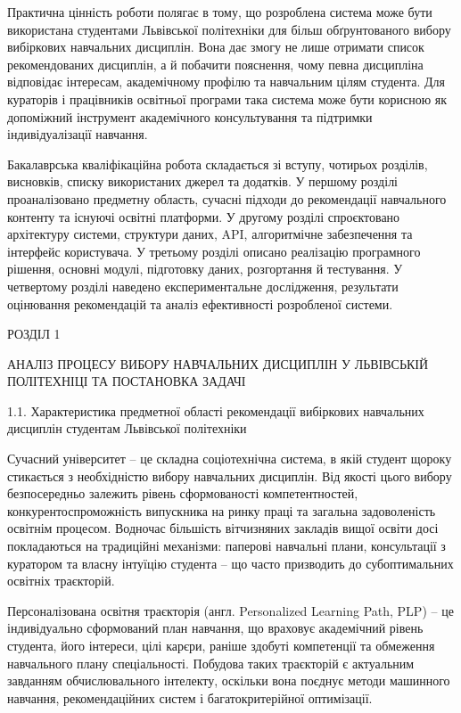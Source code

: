 \documentclass[
]{article}
\begin{document}
Практична цінність роботи полягає в тому, що розроблена система може
бути використана студентами Львівської політехніки для більш
обґрунтованого вибору вибіркових навчальних дисциплін. Вона дає змогу не
лише отримати список рекомендованих дисциплін, а й побачити пояснення,
чому певна дисципліна відповідає інтересам, академічному профілю та
навчальним цілям студента. Для кураторів і працівників освітньої
програми така система може бути корисною як допоміжний інструмент
академічного консультування та підтримки індивідуалізації навчання.

Бакалаврська кваліфікаційна робота складається зі вступу, чотирьох
розділів, висновків, списку використаних джерел та додатків. У першому
розділі проаналізовано предметну область, сучасні підходи до
рекомендації навчального контенту та існуючі освітні платформи. У
другому розділі спроєктовано архітектуру системи, структури даних, API,
алгоритмічне забезпечення та інтерфейс користувача. У третьому розділі
описано реалізацію програмного рішення, основні модулі, підготовку
даних, розгортання й тестування. У четвертому розділі наведено
експериментальне дослідження, результати оцінювання рекомендацій та
аналіз ефективності розробленої системи.

\protect{}\label{_Toc230434077}{}РОЗДІЛ 1

\protect{}\label{_Toc230434078}{}АНАЛІЗ ПРОЦЕСУ ВИБОРУ
НАВЧАЛЬНИХ ДИСЦИПЛІН У ЛЬВІВСЬКІЙ ПОЛІТЕХНІЦІ ТА ПОСТАНОВКА ЗАДАЧІ

\protect{}\label{_Toc230434079}{}1.1. Характеристика
предметної області рекомендації вибіркових навчальних дисциплін
студентам Львівської політехніки

Сучасний університет -- це складна соціотехнічна система, в якій студент
щороку стикається з необхідністю вибору навчальних дисциплін. Від якості
цього вибору безпосередньо залежить рівень сформованості
компетентностей, конкурентоспроможність випускника на ринку праці та
загальна задоволеність освітнім процесом. Водночас більшість вітчизняних
закладів вищої освіти досі покладаються на традиційні механізми:
паперові навчальні плани, консультації з куратором та власну інтуїцію
студента -- що часто призводить до субоптимальних освітніх траєкторій.

Персоналізована освітня траєкторія (англ. Personalized Learning Path,
PLP) -- це індивідуально сформований план навчання, що враховує
академічний рівень студента, його інтереси, цілі
кар\textquotesingle єри, раніше здобуті компетенції та обмеження
навчального плану спеціальності. Побудова таких траєкторій є актуальним
завданням обчислювального інтелекту, оскільки вона поєднує методи
машинного навчання, рекомендаційних систем і багатокритерійної
оптимізації.
\end{document}
